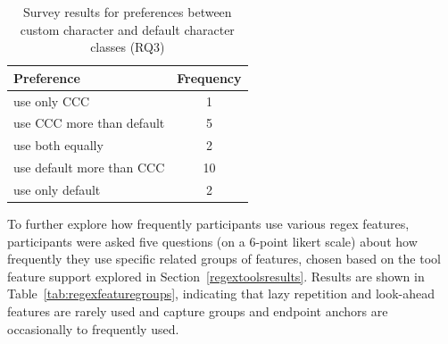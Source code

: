 \begin{table}
\caption{Survey results for preferences between custom character and default character classes (RQ3) \label{tab:cccvsdefault}}
\begin{center}
\begin{small}
\begin{tabular}{l|c}
\toprule
\textbf{Preference} & \textbf{Frequency} \\  \hline \bigstrut
use only CCC & 1\\ \hline \bigstrut
use CCC more than default & 5 \\ \hline \bigstrut
use both equally & 2\\ \hline \bigstrut
use default more than CCC & 10\\ \hline \bigstrut
use only default & 2\\
\bottomrule
\end{tabular}
\end{small}
\end{center}
\end{table}

To further explore how frequently participants use various regex features, participants were asked five questions (on a 6-point likert scale) about how frequently they use specific related groups of features,
chosen based on the tool feature support explored in Section~\ref{regextoolsresults}.
Results are shown in Table~\ref{tab:regexfeaturegroups}, indicating that lazy repetition and look-ahead features are rarely used and capture groups and endpoint anchors are occasionally to frequently used.


